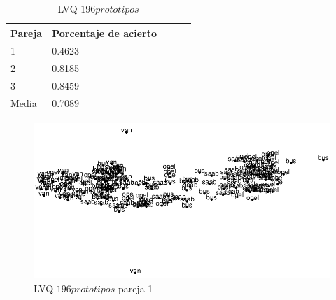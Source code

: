 \documentclass[11pt,spanish,listoffigures,listoftables]{workluis}
\begin{document}
\begin{table}[H]
\centering
\caption{LVQ $196 prototipos$}
\label{tb:tb25}
\begin{tabular}{lllll}
\hline
\multicolumn{1}{|l|}{Pareja} & Porcentaje de acierto \\ \hline \hline
1                            & 0.4623			     \\
2                            & 0.8185			     \\
3                            & 0.8459			     \\
Media                        & 0.7089         		 \\ \hline
\end{tabular}
\end{table}

\begin{figure}[H]
\centering
\includegraphics[scale=0.5]{lvq196p1}
\caption{LVQ $196 prototipos$ pareja 1}
\end{figure} 
\end{document}
